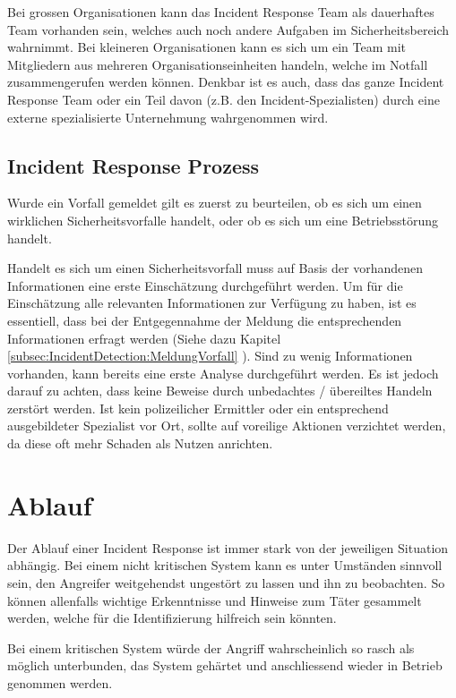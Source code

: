 Bei grossen Organisationen kann das Incident Response Team als dauerhaftes Team vorhanden sein, welches auch noch andere Aufgaben im Sicherheitsbereich wahrnimmt. Bei kleineren Organisationen kann es sich um ein Team mit Mitgliedern aus mehreren Organisationseinheiten handeln, welche im Notfall zusammengerufen werden können. Denkbar ist es auch, dass das ganze Incident Response Team oder ein Teil davon (z.B. den Incident-Spezialisten) durch eine externe spezialisierte Unternehmung wahrgenommen wird.

\subsection{Incident Response Prozess}
Wurde ein Vorfall gemeldet gilt es zuerst zu beurteilen, ob es sich um einen wirklichen Sicherheitsvorfalle handelt, oder ob es sich um eine Betriebsstörung handelt.

Handelt es sich um einen Sicherheitsvorfall muss auf Basis der vorhandenen Informationen eine erste Einschätzung durchgeführt werden. Um für die Einschätzung alle relevanten Informationen zur Verfügung zu haben, ist es essentiell, dass bei der Entgegennahme der Meldung die entsprechenden Informationen erfragt werden (Siehe dazu Kapitel \ref{subsec:IncidentDetection:MeldungVorfall} ). Sind zu wenig Informationen vorhanden, kann bereits eine erste Analyse durchgeführt werden. Es ist jedoch darauf zu achten, dass keine Beweise durch unbedachtes / übereiltes Handeln zerstört werden. Ist kein polizeilicher Ermittler oder ein entsprechend ausgebildeter Spezialist vor Ort, sollte auf voreilige Aktionen verzichtet werden, da diese oft mehr Schaden als Nutzen anrichten.


\section{Ablauf}
Der Ablauf einer Incident Response ist immer stark von der jeweiligen Situation abhängig. Bei einem nicht kritischen System kann es unter Umständen sinnvoll sein, den Angreifer weitgehendst ungestört zu lassen und ihn zu beobachten. So können allenfalls wichtige Erkenntnisse und Hinweise zum Täter gesammelt werden, welche für die Identifizierung hilfreich sein könnten.

Bei einem kritischen System würde der Angriff wahrscheinlich so rasch als möglich unterbunden, das System gehärtet und anschliessend wieder in Betrieb genommen werden.

